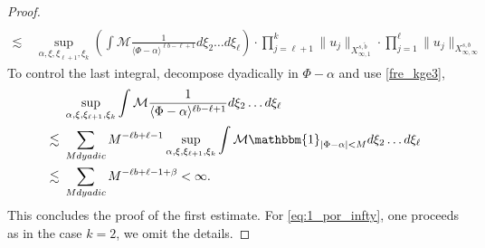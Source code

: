 \documentclass[%
11pt,  reqno]{amsart}
\newcommand{\fia}{\mathbbm{1}_{|\Phi-\alpha|<M}}
\newcommand{\jap}[1]{\langle #1 \rangle}
\newcommand{\5}{\textup{V}}
\theoremstyle{remark}
\numberwithin{equation}{section}
\numberwithin{theorem}{section}
\begin{document}
{\begin{proof}
\begin{align*}
				\\\lesssim \ &\sup_{{\alpha,  \xi, \xi_{\ell+1}, \xi_k}} \left(\int \mathcal{M} \frac{1}{ \jap{\Phi -\alpha}^{\ell b - \ell +1}} d\xi_2\dots d\xi_\ell\right) \cdot \prod_{j=\ell+1}^k \|u_j\|_{X_{\infty,1}^{s,\tilde{b}}}\cdot \prod_{j=1}^\ell \|u_j\|_{X_{\infty,\infty}^{s,b}}
			\end{align*}
			To control the last integral, decompose dyadically in $\Phi-\alpha$ and use \eqref{fre_kge3},
			\begin{align*}
				&\sup_{{\alpha,  \xi, \xi_{\ell+1}, \xi_k}} \int \mathcal{M} \frac{1}{ \jap{\Phi -\alpha}^{\ell b - \ell +1}} d\xi_2\dots d\xi_\ell \\\lesssim\ & \sum_{M dyadic} M^{-\ell b +\ell-1} \sup_{{\alpha,  \xi, \xi_{\ell+1}, \xi_k}} \int \mathcal{M} \fia d\xi_2\dots d\xi_\ell \\\lesssim\ & \sum_{M dyadic} M^{-\ell b +\ell-1+\beta} <\infty. 
			\end{align*}
			This concludes the proof of the first estimate. For \eqref{eq:1_por_infty}, one proceeds as in the case $k=2$, we omit the details.

\end{proof}}
\end{document}
